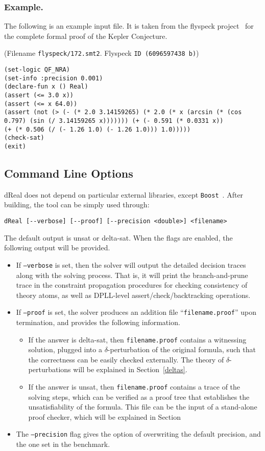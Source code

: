 \documentclass[envcountsect]{llncs}
\begin{document}
\subsubsection{Example.}\label{example} The following is an example input file.
It is taken from the flyspeck project~\cite{} for the complete formal proof of
the Kepler Conjecture. 
 \begin{example} (Filename {\tt flyspeck/172.smt2}. Flyspeck {\tt ID (6096597438
b)})
 \begin{verbatim}
(set-logic QF_NRA)
(set-info :precision 0.001)
(declare-fun x () Real)
(assert (<= 3.0 x))
(assert (<= x 64.0))
(assert (not (> (- (* 2.0 3.14159265) (* 2.0 (* x (arcsin (* (cos
0.797) (sin (/ 3.14159265 x))))))) (+ (- 0.591 (* 0.0331 x))
(+ (* 0.506 (/ (- 1.26 1.0) (- 1.26 1.0))) 1.0)))))
(check-sat)
(exit)
\end{verbatim}
\end{example}

\subsection{Command Line Options}

{\sf dReal} does not depend on particular external libraries, except
{\tt Boost}~\cite{}. After building, the tool can be simply used through: 
\begin{verbatim}
dReal [--verbose] [--proof] [--precision <double>] <filename>
\end{verbatim}
The default output is {\sf unsat} or {\sf delta-sat}. When the flags are
enabled, the following output will be provided. 
\begin{itemize}
 \item If {\tt --verbose} is set, then the solver will output the detailed
decision traces along with the solving process. That is, it will print the
branch-and-prune trace in the constraint propagation procedures for checking
consistency of theory atoms, as well as DPLL-level
assert/check/backtracking operations. 
\item If {\tt --proof} is set, the solver produces an addition file
``{\tt filename.proof}'' upon termination, and provides the following
information. 
\begin{itemize}
\item If the answer is {\sf delta-sat},
then {\tt filename.proof} contains a witnessing solution, plugged into a
$\delta$-perturbation of the original formula, such
that the correctness can be easily checked externally. The theory of
$\delta$-perturbations will be explained in Section~\ref{deltas}. 

\item If the answer is {\sf unsat}, then {\tt filename.proof} contains a trace
of the solving steps, which can be verified as a proof tree that establishes the
unsatisfiability of the formula. This file can be the input of a stand-alone
proof checker, which will be explained in
Section~\cite{proof}
\end{itemize}
\item The {\tt --precision} flag gives the option of overwriting the
default precision, and the one set in the benchmark. 
\end{itemize}
\end{document}
